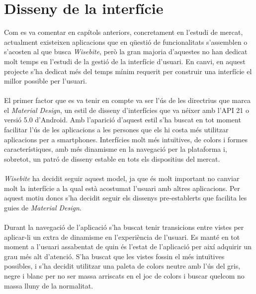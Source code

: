
\section{Disseny de la interfície}

Com es va comentar en capítols anteriors, concretament en l'estudi de mercat, actualment existeixen aplicacions que en qüestió de funcionalitats s'assemblen o s'acosten al que busca \textit{Wisebite}, però la gran majoria d'aquestes no han dedicat molt temps en l'estudi de la gestió de la interfície d'usuari. En canvi, en aquest projecte s'ha dedicat més del temps mínim requerit per construir una interfície el millor possible per l'usuari.
\\\\
El primer factor que es va tenir en compte va ser l'ús de les directrius que marca el \textit{Material Design}, un estil de disseny d'interfícies que va néixer amb l'API 21 o versió 5.0 d'Android. Amb l'aparició d'aquest estil s'ha buscat en tot moment facilitar l'ús de les aplicacions a les persones que els hi costa més utilitzar aplicacions per a smartphones. Interfícies molt més intuïtives, de colors i formes característiques, amb més dinamisme en la navegació per la plataforma i, sobretot, un patró de disseny estable en tots els dispositius del mercat.
\\\\
\textit{Wisebite} ha decidit seguir aquest model, ja que és molt important no canviar molt la interfície a la qual està acostumat l'usuari amb altres aplicacions. Per aquest motiu doncs s'ha decidit seguir els dissenys pre-establerts que facilita les guies de \textit{Material Design}.
\\\\
Durant la navegació de l'aplicació s'ha buscat tenir transicions entre vistes per aplicar-li un extra de dinamisme en l'experiència de l'usuari. Es manté en tot moment a l'usuari assabentat de quin és l'estat de l'aplicació per així adquirir un grau més alt d'atenció. S'ha buscat que les vistes fossin el més intuïtives possibles, i s'ha decidit utilitzar una paleta de colors neutre amb l'ús del gris, negre i blanc per no ser massa arriscats en el joc de colors i buscar quelcom no massa lluny de la normalitat.
\\\\
